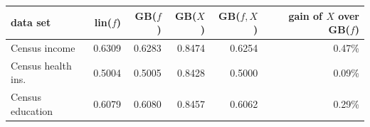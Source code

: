 \begin{tabular}{lrrrrr}
\toprule
data set & lin($f$) & GB($f$) & GB($X$) & GB($f,X$) & gain of $X$ over GB($f$)\\
\midrule
Census income & 0.6309 & 0.6283 & 0.8474 & 0.6254 & 0.47\%\\
Census health ins. & 0.5004 & 0.5005 & 0.8428 & 0.5000 & 0.09\%\\
Census education & 0.6079 & 0.6080 & 0.8457 & 0.6062 & 0.29\%\\
\bottomrule
\end{tabular}